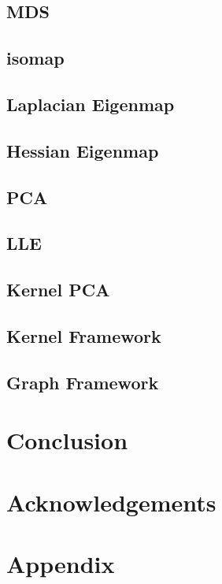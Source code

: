 \subsection{MDS}

\subsection{isomap}

\subsection{Laplacian Eigenmap}

\subsection{Hessian Eigenmap}

\subsection{PCA}

\subsection{LLE}

\subsection{Kernel PCA}

\subsection{Kernel Framework}

\subsection{Graph Framework}


\section{Conclusion}
\label{sec:conclusion}



\section*{Acknowledgements}




\section*{Appendix}




